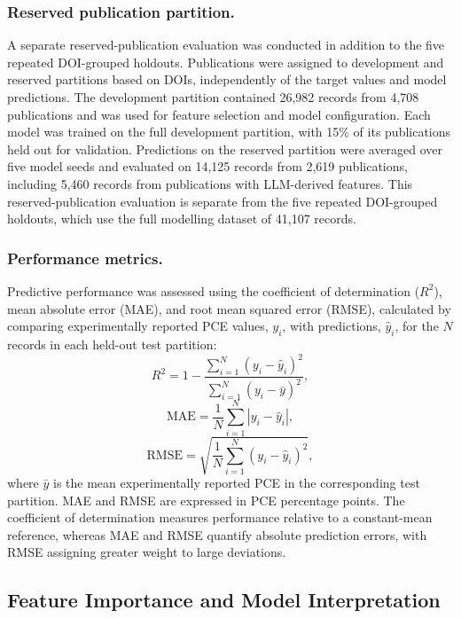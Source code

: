 \documentclass[3p]{elsarticle}
\begin{document}
\subsubsection{Reserved publication partition.}
A separate reserved-publication evaluation was conducted in addition to the five repeated DOI-grouped holdouts. Publications were assigned to development and reserved partitions based on DOIs, independently of the target values and model predictions. The development partition contained 26,982 records from 4,708 publications and was used for feature selection and model configuration. Each model was trained on the full development partition, with 15\% of its publications held out for validation. Predictions on the reserved partition were averaged over five model seeds and evaluated on 14,125 records from 2,619 publications, including 5,460 records from publications with LLM-derived features. This reserved-publication evaluation is separate from the five repeated DOI-grouped holdouts, which use the full modelling dataset of 41,107 records.

\subsubsection{Performance metrics.}
Predictive performance was assessed using the coefficient of determination ($R^2$), mean absolute error (MAE), and root mean squared error (RMSE), calculated by comparing experimentally reported PCE values, $y_i$, with predictions, $\hat{y}_i$, for the $N$ records in each held-out test partition:
\begin{equation}
    R^2 =
    1-\frac{\sum_{i=1}^{N}(y_i-\hat{y}_i)^2}
    {\sum_{i=1}^{N}(y_i-\bar{y})^2},
\end{equation}
\begin{equation}
    \mathrm{MAE} =
    \frac{1}{N}\sum_{i=1}^{N}|y_i-\hat{y}_i|,
\end{equation}
\begin{equation}
    \mathrm{RMSE} =
    \sqrt{\frac{1}{N}\sum_{i=1}^{N}(y_i-\hat{y}_i)^2},
\end{equation}
where $\bar{y}$ is the mean experimentally reported PCE in the corresponding test partition. MAE and RMSE are expressed in PCE percentage points. The coefficient of determination measures performance relative to a constant-mean reference, whereas MAE and RMSE quantify absolute prediction errors, with RMSE assigning greater weight to large deviations.

\subsection{Feature Importance and Model Interpretation}
\end{document}
